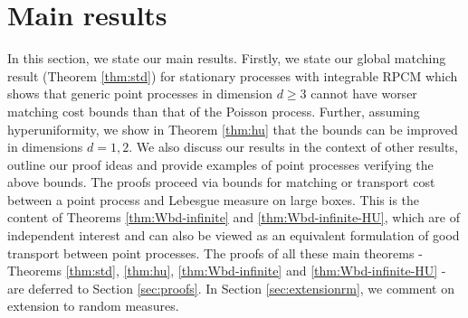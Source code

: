 \documentclass[12pt]{article}
\newcommand{\1}{\mathbf{1}}
\begin{document}
{{\section{Main results}
\label{sec:mainresults}
In this section, we state our main results. Firstly, we state our global matching result {(Theorem \ref{thm:std})} for stationary processes with integrable RPCM which shows that {generic point processes {in dimension $d \geq 3$} cannot have worser matching cost bounds than that of the Poisson process}. Further, assuming hyperuniformity, we show in {Theorem \ref{thm:hu}} that the bounds can be improved {in dimensions $d = 1,2$}. We also discuss our results in the context of other results, outline our proof ideas and provide examples of point processes verifying the above bounds. {The proofs  proceed via bounds for matching or transport cost between a point process and Lebesgue measure on large boxes. This is the content of Theorems \ref{thm:Wbd-infinite} and \ref{thm:Wbd-infinite-HU}, which are of independent interest and can also be viewed as an equivalent formulation of good transport between point processes.} The proofs of all these main theorems - Theorems \ref{thm:std}, \ref{thm:hu}, \ref{thm:Wbd-infinite} and \ref{thm:Wbd-infinite-HU} - are deferred to Section \ref{sec:proofs}. In Section \ref{sec:extensionrm}, we comment on extension to random measures.

}}
\end{document}
